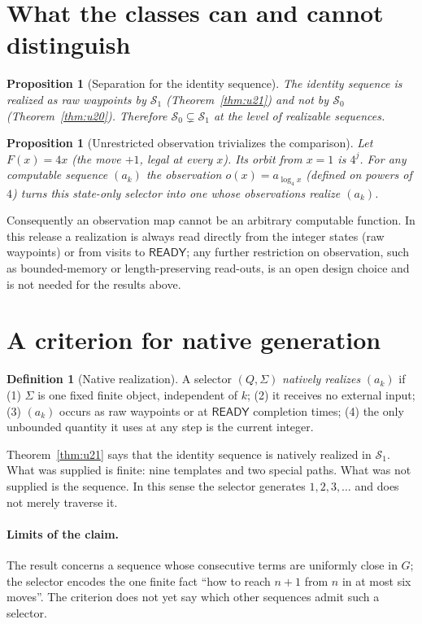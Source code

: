 \documentclass[11pt]{article}
\newtheorem{proposition}[theorem]{Proposition}
\theoremstyle{definition}
\newtheorem{definition}[theorem]{Definition}
\newcommand{\RDY}{\mathsf{READY}}
\begin{document}
\section{What the classes can and cannot distinguish}\label{sec:classes}
\begin{proposition}[Separation for the identity sequence]\label{prop:sep}
The identity sequence is realized as raw waypoints by $\mathcal S_1$ (Theorem~\ref{thm:u21}) and not by $\mathcal S_0$ (Theorem~\ref{thm:u20}). Therefore $\mathcal S_0\subsetneq\mathcal S_1$ at the level of realizable sequences.
\end{proposition}
\begin{proposition}[Unrestricted observation trivializes the comparison]\label{prop:obs}
Let $F(x)=4x$ (the move $+1$, legal at every $x$). Its orbit from $x=1$ is $4^j$. For any computable sequence $(a_k)$ the observation $o(x)=a_{\log_4x}$ (defined on powers of $4$) turns this state-only selector into one whose observations realize $(a_k)$.
\end{proposition}
Consequently an observation map cannot be an arbitrary computable function. In this release a realization is always read directly from the integer states (raw waypoints) or from visits to $\RDY$; any further restriction on observation, such as bounded-memory or length-preserving read-outs, is an open design choice and is not needed for the results above.

\section{A criterion for native generation}\label{sec:native}
\begin{definition}[Native realization]\label{def:native}
A selector $(Q,\Sigma)$ \emph{natively realizes} $(a_k)$ if (1) $\Sigma$ is one fixed finite object, independent of $k$; (2) it receives no external input; (3) $(a_k)$ occurs as raw waypoints or at $\RDY$ completion times; (4) the only unbounded quantity it uses at any step is the current integer.
\end{definition}
Theorem~\ref{thm:u21} says that the identity sequence is natively realized in $\mathcal S_1$. What was supplied is finite: nine templates and two special paths. What was not supplied is the sequence. In this sense the selector generates $1,2,3,\ldots$ and does not merely traverse it.
\paragraph{Limits of the claim.} The result concerns a sequence whose consecutive terms are uniformly close in $G$; the selector encodes the one finite fact ``how to reach $n+1$ from $n$ in at most six moves''. The criterion does not yet say which other sequences admit such a selector.
\end{document}
